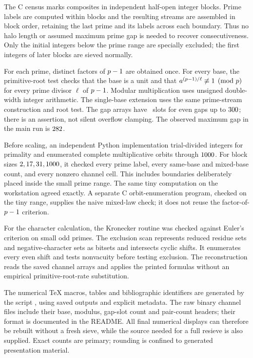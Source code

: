 \documentclass[11pt]{article}
\begin{document}
The C census marks composites in independent half-open integer blocks. Prime
labels are computed within blocks and the resulting streams are assembled in
block order, retaining the last prime and its labels across each boundary.
Thus no halo length or assumed maximum prime gap is needed to recover
consecutiveness. Only the initial integers below the prime range are specially
excluded; the first integers of later blocks are sieved normally.

For each prime, distinct factors of $p-1$ are obtained once. For every base,
the primitive-root test checks that the base is a unit and that
$a^{(p-1)/\ell}\not\equiv1\pmod p$ for every prime divisor $\ell$ of
$p-1$. Modular multiplication uses unsigned double-width integer arithmetic.
The single-base extension uses the same prime-stream construction and root test.
The gap arrays have \ChannelSlots\ slots for even gaps up to $300$;
there is an assertion, not silent overflow clamping. The observed maximum gap
in the main run is $282$.

Before scaling, an independent Python implementation trial-divided
integers for primality and enumerated complete multiplicative orbits through
$1000$. For block sizes $2,17,31,1000$, it checked every
prime label, every same-base and mixed-base count, and every nonzero channel
cell. This includes boundaries deliberately placed inside the small prime
range. The same tiny computation on the workstation agreed exactly.
A separate C orbit-enumeration program, checked on the tiny range, supplies
the naive mixed-law check; it does not reuse the factor-of-$p-1$ criterion.

For the character calculation, the Kronecker routine was checked against
Euler's criterion on small odd primes. The exclusion scan represents reduced
residue sets and negative-character sets as bitsets and intersects cyclic
shifts. It enumerates every even shift and tests nonvacuity before testing
exclusion. The reconstruction reads the saved channel arrays and applies the
printed formulas without an empirical primitive-root-rate substitution.

The numerical TeX macros, tables and bibliographic identifiers are generated
by the script , using saved outputs and explicit metadata.
The raw binary channel files include their base, modulus, gap-slot count and
pair-count headers; their format is documented in the README. All final
numerical displays can therefore be rebuilt without a fresh sieve, while the
source needed for a full resieve is also supplied. Exact counts are primary;
rounding is confined to generated presentation material.
\end{document}
